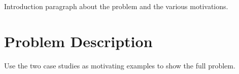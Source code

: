 \label{chapter:problem}

\newlength{\savedunitlength}
\setlength{\unitlength}{2em}

Introduction paragraph about the problem and the various motivations.




\section{Problem Description}

Use the two case studies as motivating examples to show the full problem.

\setlength{\unitlength}{\savedunitlength}

